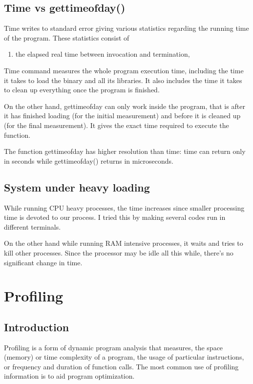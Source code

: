 \documentclass[11pt]{article}
\begin{document}
\subsection{Time vs gettimeofday()}
Time writes to standard error giving various statistics regarding the running time of the program. These statistics consist of 
\begin{enumerate}
\item the elapsed real time between invocation and termination, 
\end{enumerate}
Time command measures the whole program execution time, including the time it takes to load the binary and all its libraries. It also includes the time it takes to clean up everything once the program is finished.

On the other hand, gettimeofday can only work inside the program, that is after it has finished loading (for the initial measurement) and before it is cleaned up (for the final measurement). It gives the exact time required to execute the function.

The function gettimeofday has higher resolution than time: time can return only in seconds while gettimeofday() returns in microseconds.

\subsection{System under heavy loading}
While running CPU heavy processes, the time increases since smaller processing time is devoted to our process. I tried this by making several codes run in different terminals.

On the other hand while running RAM intensive processes, it waits and tries to kill other processes. Since the processor may be idle all this while, there's no significant change in time. 

\section{Profiling}
\subsection{Introduction}

Profiling is a form of dynamic program analysis that measures, the space (memory) or time complexity of a program, the usage of particular instructions, or frequency and duration of function calls. The most common use of profiling information is to aid program optimization.
\end{document}

